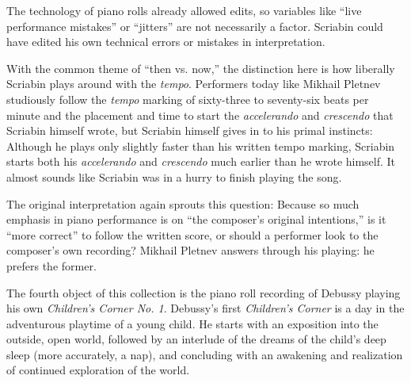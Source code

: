 \documentclass[titlepage,14pt]{article}
\begin{document}
\begin{doublespace}

The technology of piano rolls already allowed edits, so variables like ``live performance mistakes'' or ``jitters'' are not necessarily a factor. Scriabin could have edited his own technical errors or mistakes in interpretation.

With the common theme of ``then vs. now,'' the distinction here is how liberally Scriabin plays around with the \textit{tempo}. Performers today like Mikhail Pletnev studiously follow the \textit{tempo} marking of sixty-three to seventy-six beats per minute and the placement and time to start the \textit{accelerando} and \textit{crescendo} that Scriabin himself wrote,\autocite{mikhail} but Scriabin himself gives in to his primal instincts: Although he plays only slightly faster than his written tempo marking, Scriabin starts both his \textit{accelerando} and \textit{crescendo} much earlier than he wrote himself.\autocite{scriabinscore} It almost sounds like Scriabin was in a hurry to finish playing the song.

The original interpretation again sprouts this question: Because so much emphasis in piano performance is on ``the composer's original intentions,'' is it ``more correct'' to follow the written score, or should a performer look to the composer's own recording? Mikhail Pletnev answers through his playing: he prefers the former. \autocite{mikhail}

The fourth object of this collection is the piano roll recording of Debussy playing his own \textit{Children's Corner No. 1}. \autocite{debussy} Debussy's first \textit{Children's Corner} is a day in the adventurous playtime of a young child. He starts with an exposition into the outside, open world, followed by an interlude of the dreams of the child's deep sleep (more accurately, a nap), and concluding with an awakening and realization of continued exploration of the world.



\end{doublespace}
\end{document}
